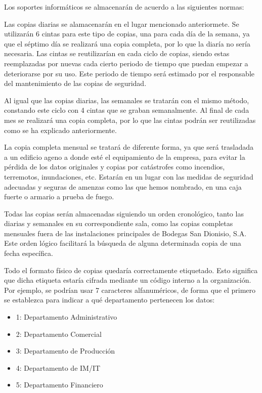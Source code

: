 \documentclass[a4paper,11pt,bibtotoc,noliststotoc]{scrbook}
\begin{document}
\begin{itemize}
Los soportes informáticos se almacenarán de acuerdo a las siguientes normas:

Las copias diarias se alamacenarán en el lugar mencionado anteriormete. Se utilizarán 6 cintas para este tipo de copias, una para cada día de la semana, ya que el séptimo día se realizará una copia completa, por lo que la diaría no sería necesaria. Las cintas se reutilizarían en cada ciclo de copias, siendo estas reemplazadas por nuevas cada cierto periodo de tiempo que puedan empezar a deteriorarse por su uso. Este periodo de tiempo será estimado por el responsable del mantenimiento de las copias de seguridad.

Al igual que las copias diarias, las semanales se tratarán con el mismo método, constando este ciclo con 4 cintas que se graban semanalmente. Al final de cada mes se realizará una copia completa, por lo que las cintas podrán ser reutilizadas como se ha explicado anteriormente.

La copia completa mensual se tratará de diferente forma, ya que será trasladada a un edificio ageno a donde esté el equipamiento de la empresa, para evitar la pérdida de los datos originales y copias por catástrofes como incendios, terremotos, inundaciones, etc. Estarán en un lugar con las medidas de seguridad adecuadas y seguras de amenzas como las que hemos nombrado, en una caja fuerte o armario a prueba de fuego.

Todas las copias serán almacenadas siguiendo un orden cronológico, tanto las diarias y semanales en su correspondiente sala, como las copias completas mensuales fuera de las instalaciones principales de Bodegas San Dionisio, S.A. Este orden lógico facilitará la búsqueda de alguna determinada copia de una fecha específica.

Todo el formato físico de copias quedaría correctamente etiquetado. Esto significa que dicha etiqueta estaría cifrada mediante un código interno a la organización. Por ejemplo, se podrían usar 7 caracteres alfanuméricos, de forma que el primero se establezca para indicar a qué departamento pertenecen los datos:

\begin{itemize}
\item 1: Departamento Administrativo 
\item 2: Departamento Comercial
\item 3: Departamento de Producción
\item 4: Departamento de IM/IT
\item 5: Departamento Financiero
\end{itemize}


\end{itemize}
\end{document}
